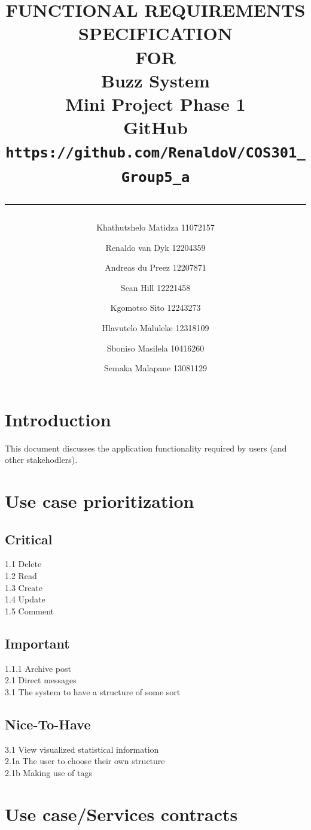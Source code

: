 \documentclass{scrreprt}
\title{%
\author{
Khathutshelo Matidza 11072157\\
\and
Renaldo van Dyk 12204359\\
\and
Andreas du Preez 12207871\\
\and
Sean Hill 12221458\\
\and
Kgomotso Sito 12243273\\
\and
Hlavutelo Maluleke 12318109\\
\and
Sboniso Masilela 10416260\\
\and
Semaka Malapane 13081129\\
}
\centering
\Huge{FUNCTIONAL REQUIREMENTS\\ SPECIFICATION}\\
\vspace{2cm}
FOR\\
\vspace{2cm}
Buzz System\\
\vspace{2cm}
Mini Project Phase 1\\
GitHub\\
\LARGE\texttt{https://github.com/RenaldoV/COS301\_Group5\_a}
\vfill
\vspace{1cm}
\rule{15cm}{3pt}
}
\date{}
\begin{document}
\maketitle
\tableofcontents
\chapter{ Introduction}
This document discusses the application functionality required by users (and other stakehodlers).\\
\chapter{ Use case prioritization}
\section{Critical}
1.1 Delete\\
1.2 Read\\
1.3 Create\\
1.4 Update\\
1.5 Comment\\
\section{Important}
1.1.1 Archive post\\
2.1 Direct messages\\
3.1 The system to have a structure of some sort\\
\section{Nice-To-Have}
3.1 View visualized statistical information\\
2.1{a} The user to choose their own structure\\
2.1{b} Making use of tags\\
\chapter{Use case/Services contracts}
\end{document}
